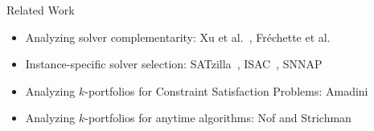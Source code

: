 \documentclass[en]{sdqbeamer}
\begin{document}
\begin{frame}[t]{Related Work}
	\begin{itemize}
		\item Analyzing solver complementarity: Xu et al.~\cite{Xu:2012:EvalContribVBS}, Fr{\'e}chette et al.~\cite{frechette2016using}
		\pause
		\vspace{\baselineskip}
		\item Instance-specific solver selection: SATzilla~\cite{xu2008satzilla, xu2012satzilla2012}, ISAC~\cite{Kadioglu:2010:ISAC}, SNNAP~\cite{Collautti:2013:SNNAP}
		\pause
		\vspace{\baselineskip}
		\item Analyzing $k$-portfolios for Constraint Satisfaction Problems: Amadini~\cite{amadini2014empirical, amadini2016extensive}
		\pause
		\vspace{\baselineskip}
		\item Analyzing $k$-portfolios for anytime algorithms: Nof and Strichman~\cite{nof2020real}
	\end{itemize}
\end{frame}
\end{document}
